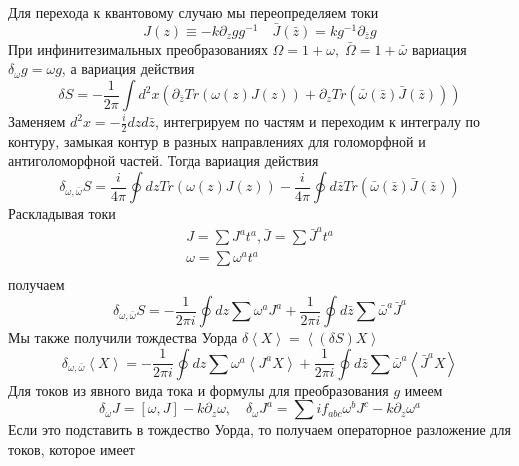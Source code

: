 Для перехода к квантовому случаю мы переопределяем токи
\begin{equation}
  \label{eq:82}
  J(z)\equiv -k \partial_zg g^{-1}\quad \bar J(\bar z)=k g^{-1}\partial_{\bar z}g
\end{equation}
 При инфинитезимальных преобразованиях $\Omega=1+\omega,\; \bar \Omega =1+\bar \omega$ вариация
 $\delta_{\omega}g=\omega g$, а вариация действия
 \begin{equation}
   \label{eq:11}
   \delta S=-\frac{1}{2\pi}\int d^2 x \left(\partial_{\bar z}Tr(\omega(z)J(z))+\partial_z Tr(\bar
     \omega(\bar z)\bar J(\bar z))\right)
 \end{equation}
Заменяем $d^2 x=-\frac{i}{2} dz d\bar z$, интегрируем по частям и переходим к интегралу по контуру, замыкая
контур в разных направлениях для голоморфной и антиголоморфной частей.
Тогда вариация действия
\begin{equation}
  \label{eq:83}
  \delta_{\omega,\bar\omega}S=\frac{i}{4\pi}\oint dz Tr (\omega(z)J(z))-\frac{i}{4\pi}\oint d\bar z Tr(\bar\omega(\bar z)\bar J(\bar z))
\end{equation}
Раскладывая токи
\begin{equation}
  \label{eq:85}
  \begin{aligned}
    J=\sum J^a t^a,\bar J=\sum \bar J^a t^a \\
    \omega=\sum \omega^a t^a\\
  \end{aligned}
\end{equation}
получаем
\begin{equation}
  \label{eq:86}
  \delta_{\omega,\bar \omega}S=-\frac{1}{2\pi i}\oint dz \sum\omega^a J^a+\frac{1}{2\pi i} \oint d\bar z \sum \bar \omega^a \bar J^a
\end{equation}
Мы также получили тождества Уорда $\delta\left< X\right>=\left<(\delta S)X\right>$
\begin{equation}
  \label{eq:87}
  \delta_{\omega,\bar \omega}\left< X \right>=-\frac{1}{2\pi i}\oint dz \sum\omega^a \left< J^a X\right>+
  \frac{1}{2\pi i} \oint d\bar z \sum \bar \omega^a \left< \bar J^a X\right>
\end{equation}
Для токов из явного вида тока и формулы для преобразования $g$ имеем
\begin{equation}
  \label{eq:88}
  \delta_{\omega}J=[\omega,J]-k\partial_z\omega,\quad \delta_{\omega}J^a=\sum i f_{abc}\omega^b J^c-k\partial_z\omega^a
\end{equation}
Если это подставить в тождество Уорда, то получаем операторное разложение для токов, которое имеет
